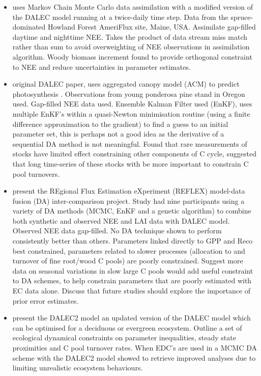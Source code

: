 \documentclass[12pt, a4paper]{article}
\begin{document}
\begin{itemize}
\item \citet{richardson2010estimating} uses Markov Chain Monte Carlo data assimilation with a modified version of the DALEC model running at a twice-daily time step. Data from the spruce-dominated Howland Forest AmeriFlux site, Maine, USA. Assimilate gap-filled daytime and nighttime NEE. Takes the product of data stream miss match rather than sum to avoid overweighting of NEE observations in assimilation algorithm. Woody biomass increment found to provide orthogonal constraint to NEE and reduce uncertainties in parameter estimates.

\item \citet{williams2005improved} original DALEC paper, uses aggregated canopy model (ACM) to predict photosynthesis \citep{williams1997predicting}. Observations from young ponderosa pine stand in Oregon used. Gap-filled NEE data used. Ensemble Kalman Filter used (EnKF), uses multiple EnKF's within a quasi-Newton minimisation routine (using a finite difference approximation to the gradient) to find a guess to an initial parameter set, this is perhaps not a good idea as the derivative of a sequential DA method is not meaningful. Found that rare measurements of stocks have limited effect constraining other components of C cycle, suggested that long time-series of these stocks with be more important to constrain C pool turnovers.

\item \citet{fox2009reflex} present the REgional Flux Estimation eXperiment (REFLEX) model-data fusion (DA) inter-comparison project. Study had nine participants using a variety of DA methods (MCMC, EnKF and a genetic algorithm) to combine both synthetic and observed NEE and LAI data with DALEC model. Observed NEE data gap-filled. No DA technique shown to perform consistently better than others. Parameters linked directly to GPP and Reco best constrained, parameters related to slower processes (allocation to and turnover of fine root/wood C pools) are poorly constrained. Suggest more data on seasonal variations in slow large C pools would add useful constraint to DA schemes, to help constrain parameters that are poorly estimated with EC data alone. Discuss that future studies should explore the importance of prior error estimates.

\item \citet{Bloom2015} present the DALEC2 model an updated version of the DALEC model which can be optimised for a deciduous or evergreen ecosystem. Outline a set of ecological dynamical constraints on parameter inequalities, steady state proximities and C pool turnover rates. When EDC's are used in a MCMC DA scheme with the DALEC2 model showed to retrieve improved analyses due to limiting unrealistic ecosystem behaviours. 


\end{itemize}
\end{document}
